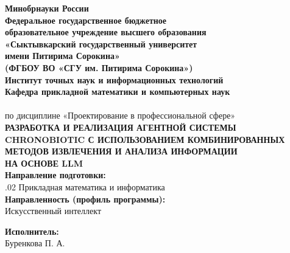 \thispagestyle{empty}

\begin{center}
	{\bfseries\fontsize{12pt}{14pt}\selectfont Минобрнауки России}\\
	
	{\bfseries\fontsize{12pt}{14pt}\selectfont Федеральное государственное бюджетное\\
		образовательное учреждение высшего образования\\
		«Сыктывкарский государственный университет\\
		имени Питирима Сорокина»\\
		(ФГБОУ ВО «СГУ им. Питирима Сорокина»)}\\
	
	{\bfseries\fontsize{12pt}{14pt}\selectfont Институт точных наук и информационных технологий}\\
	
	{\bfseries\fontsize{12pt}{14pt}\selectfont Кафедра прикладной математики и компьютерных наук}\\[0.5cm]
	
	{\fontsize{16pt}{20pt}}\\[0.2cm]
	
	{\fontsize{12pt}{14pt}\selectfont по дисциплине «Проектирование в профессиональной сфере»}\\
	
	{\bfseries\fontsize{14pt}{18pt}\selectfont
		РАЗРАБОТКА И РЕАЛИЗАЦИЯ АГЕНТНОЙ СИСТЕМЫ\\
		CHRONOBIOTIC С ИСПОЛЬЗОВАНИЕМ КОМБИНИРОВАННЫХ\\
		МЕТОДОВ ИЗВЛЕЧЕНИЯ И АНАЛИЗА ИНФОРМАЦИИ\\
		НА ОСНОВЕ LLM}\\[1cm]
	
	{\bfseries\fontsize{12pt}{14pt}\selectfont Направление подготовки:}\\
	{\fontsize{12pt}{14pt}.02 Прикладная математика и информатика}\\
	
	{\bfseries\fontsize{12pt}{14pt}\selectfont Направленность (профиль программы):}\\
	{\fontsize{12pt}{14pt}\selectfont Искусственный интеллект}\\
\end{center}

\noindent
{\bfseries\fontsize{12pt}{14pt}\selectfont Исполнитель:}\\
{\fontsize{12pt}{14pt}\selectfont Буренкова П. А. \underline{\hspace{6cm}}}\\

